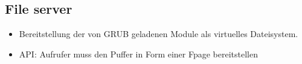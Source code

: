 \subsection{File server}





\begin{itemize}
	\item Bereitstellung der von GRUB geladenen Module als virtuelles Dateisystem.
	
	\item API: Aufrufer muss den Puffer in Form einer Fpage bereitstellen

\end{itemize}

